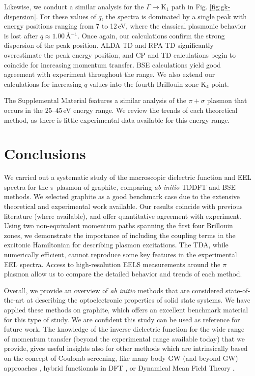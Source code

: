 \documentclass[aps,prb,10pt,showpacs,superscriptaddress,twocolumn,notitlepage]{revtex4-1}
\begin{document}
Likewise, we conduct a similar analysis for the $\Gamma \rightarrow
\mathrm{K}_{1}$ path in Fig. \ref{fig:gk-dispersion}. For these values of
$q$, the spectra is dominated by a single peak with energy positions ranging
from 7 to 12\,eV, where the classical plasmonic behavior is lost after $q\approx
1.00$\,\r{A}$^{-1}$. Once again, our calculations confirm the strong dispersion
of the peak position. ALDA TD and RPA TD significantly overestimate the peak
energy position, and CP and TD calculations begin to coincide for increasing
momentum transfer. BSE calculations yield good agreement with experiment
throughout the range. We also extend our calculations for increasing $q$ values
into the fourth Brillouin zone K$_{4}$ point.

The Supplemental Material \cite{supplement} features a similar analysis of the $\pi + \sigma$
plasmon that occurs in the 25--45\,eV energy range. We review the trends of each
theoretical method, as there is little experimental data available for this
energy range.


\section{Conclusions}\label{sec:conclusions}

We carried out a systematic study of the macroscopic dielectric function and EEL
spectra for the $\pi$ plasmon of graphite, comparing \emph{ab initio} TDDFT and
BSE methods. We selected graphite as a good benchmark case due to the extensive
theoretical and experimental work available. Our results coincide with previous
literature (where available), and offer quantitative agreement with experiment.
Using two non-equivalent momentum paths spanning the first four Brillouin zones,
we demonstrate the importance of including the coupling terms in the excitonic
Hamiltonian for describing plasmon excitations. The TDA, while numerically
efficient, cannot reproduce some key features in the experimental EEL spectra.
Access to high-resolution EELS measurements around the $\pi$ plasmon allow us to
compare the detailed behavior and trends of each method.

Overall, we provide an overview of \emph{ab initio} methods that are considered
state-of-the-art at describing the optoelectronic properties of solid state
systems. We have applied these methods on graphite, which offers an excellent
benchmark material for this type of study. We are confident this study can be
used as reference for future work. The knowledge of the inverse dielectric
function for the wide range of momentum transfer (beyond the
experimental range available today) that we provide, gives useful insights also
for other methods which are intrinsically based on the concept of Coulomb
screening, like many-body GW (and beyond GW) approaches \cite{rodlPRB17,
luciabook}, hybrid functionals in DFT \cite{krukauJCP06}, or Dynamical Mean
Field Theory \cite{biermannJPCM14}.
\end{document}
